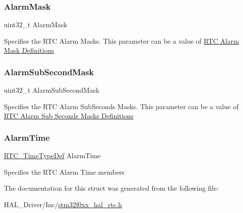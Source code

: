 \subsubsection{\texorpdfstring{Alarm\+Mask}{AlarmMask}}
{\footnotesize\ttfamily uint32\+\_\+t Alarm\+Mask}

Specifies the R\+TC Alarm Masks. This parameter can be a value of \hyperlink{group___r_t_c___alarm_mask___definitions}{R\+TC Alarm Mask Definitions} \mbox{\label{struct_r_t_c___alarm_type_def_a039e2025c1ed1a817878070f54716f09}} 
\subsubsection{\texorpdfstring{Alarm\+Sub\+Second\+Mask}{AlarmSubSecondMask}}
{\footnotesize\ttfamily uint32\+\_\+t Alarm\+Sub\+Second\+Mask}

Specifies the R\+TC Alarm Sub\+Seconds Masks. This parameter can be a value of \hyperlink{group___r_t_c___alarm___sub___seconds___masks___definitions}{R\+TC Alarm Sub Seconds Masks Definitions} \mbox{\label{struct_r_t_c___alarm_type_def_a8607cf90e5e86480f6093a0f78c9f0d8}} 
\subsubsection{\texorpdfstring{Alarm\+Time}{AlarmTime}}
{\footnotesize\ttfamily \hyperlink{struct_r_t_c___time_type_def}{R\+T\+C\+\_\+\+Time\+Type\+Def} Alarm\+Time}

Specifies the R\+TC Alarm Time members 

The documentation for this struct was generated from the following file\+:\begin{DoxyCompactItemize}
\item 
H\+A\+L\+\_\+\+Driver/\+Inc/\hyperlink{stm32f0xx__hal__rtc_8h}{stm32f0xx\+\_\+hal\+\_\+rtc.\+h}\end{DoxyCompactItemize}
